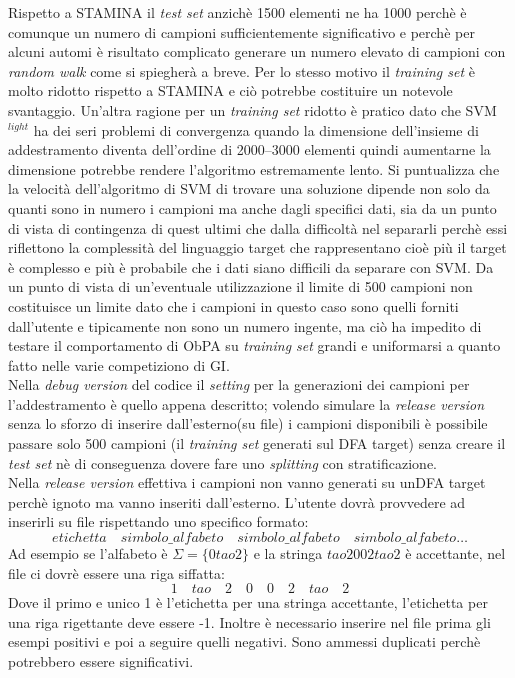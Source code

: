 Rispetto a STAMINA il \textit{test set} anzichè 1500 elementi ne ha 1000 perchè è comunque un numero di campioni sufficientemente significativo e perchè per alcuni automi è risultato  complicato generare un numero elevato di campioni con \textit{random walk} come si spiegherà a breve. Per lo stesso motivo il \textit{training set} è molto ridotto rispetto a STAMINA e ciò potrebbe costituire un notevole svantaggio. Un'altra ragione per un \textit{training set} ridotto è pratico dato che SVM$^{light}$ ha dei seri problemi di convergenza quando la dimensione dell'insieme di addestramento diventa dell'ordine di 2000--3000 elementi quindi aumentarne la dimensione potrebbe rendere l'algoritmo estremamente lento. Si puntualizza che la velocità dell'algoritmo di \ac{SVM} di trovare una soluzione dipende non solo da quanti sono in numero i campioni ma anche dagli specifici dati, sia da un punto di vista di contingenza di quest ultimi che dalla difficoltà nel separarli perchè essi riflettono la complessità del linguaggio target che rappresentano cioè più il target è complesso e più è probabile che i dati siano difficili da separare con \ac{SVM}. Da un punto di vista di un'eventuale utilizzazione il limite di 500 campioni non costituisce un limite dato che i campioni in questo caso sono quelli forniti dall'utente e tipicamente non sono un numero ingente, ma ciò ha impedito di testare il comportamento di \ac{ObPA} su \textit{training set} grandi e uniformarsi a quanto fatto nelle varie competiziono di \ac{GI}.  \\ 
 Nella \textit{debug version} del codice il \textit{setting} per la generazioni dei campioni per l'addestramento è quello appena descritto; volendo simulare la  \textit{release version} senza lo sforzo di inserire dall'esterno(su file) i campioni disponibili è possibile passare  solo 500 campioni (il \textit{training set} generati sul \ac{DFA} target) senza creare il \textit{test set} nè di conseguenza dovere fare uno \textit{splitting} con stratificazione. \\
Nella \textit{release version} effettiva i campioni non vanno generati su un\ac{DFA} target perchè ignoto ma vanno inseriti dall'esterno. L'utente dovrà provvedere ad inserirli su file rispettando uno specifico formato:  
\begin{equation*}
etichetta \quad simbolo\_alfabeto \quad simbolo\_alfabeto \quad simbolo\_alfabeto \dots
\end{equation*}
Ad esempio se l'alfabeto è $\Sigma = \{0 tao 2\}$ e la stringa $tao2002tao2$ è accettante, nel file ci dovrè essere una riga siffatta:
\begin{equation*}
1 \quad tao \quad 2 \quad 0 \quad 0 \quad 2 \quad tao \quad 2
\end{equation*}
Dove il primo e unico 1 è l'etichetta per una stringa accettante, l'etichetta per una riga rigettante deve essere -1. Inoltre è necessario inserire nel file prima gli esempi positivi e poi a seguire quelli negativi. Sono ammessi duplicati perchè potrebbero essere significativi.\\

